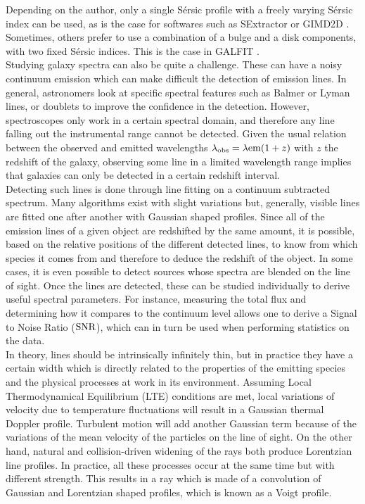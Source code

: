 Depending on the author, only a single Sérsic profile with a freely varying Sérsic index can be used, as is the case for softwares such as SExtractor  or GIMD2D . Sometimes, others prefer to use a combination of a bulge and a disk components, with two fixed Sérsic indices. This is the case in GALFIT . \\

Studying galaxy spectra can also be quite a challenge. These can have a noisy continuum emission which can make difficult the detection of emission lines. In general, astronomers look at specific spectral features such as Balmer or Lyman lines, or doublets to improve the confidence in the detection. However, spectroscopes only work in a certain spectral domain, and therefore any line falling out the instrumental range cannot be detected. Given the usual relation between the observed and emitted wavelengths $\lambda_{\rm{obs}} = \lambda{\rm{em}} ( 1+ z)$ with $z$ the redshift of the galaxy, observing some line in a limited wavelength range implies that galaxies can only be detected in a certain redshift interval. \\

Detecting such lines is done through line fitting on a continuum subtracted spectrum. Many algorithms exist with slight variations but, generally, visible lines are fitted one after another with Gaussian shaped profiles. Since all of the emission lines of a given object are redshifted by the same amount, it is possible, based on the relative positions of the different detected lines, to know from which species it comes from and therefore to deduce the redshift of the object. In some cases, it is even possible to detect sources whose spectra are blended on the line of sight. Once the lines are detected, these can be studied individually to derive useful spectral parameters. For instance, measuring the total flux and determining how it compares to the continuum level allows one to derive a Signal to Noise Ratio ($\rm{SNR}$), which can in turn be used when performing statistics on the data. \\

In theory, lines should be intrinsically infinitely thin, but in practice they have a certain width which is directly related to the properties of the emitting species and the physical processes at work in its environment. Assuming Local Thermodynamical Equilibrium (LTE) conditions are met, local variations of velocity due to temperature fluctuations will result in a Gaussian thermal Doppler profile. Turbulent motion will add another Gaussian term because of the variations of the mean velocity of the particles on the line of sight. On the other hand, natural and collision-driven widening of the rays both produce Lorentzian line profiles. In practice, all these processes occur at the same time but with different strength. This results in a ray which is made of a convolution of Gaussian and Lorentzian shaped profiles, which is known as a Voigt profile. \\

